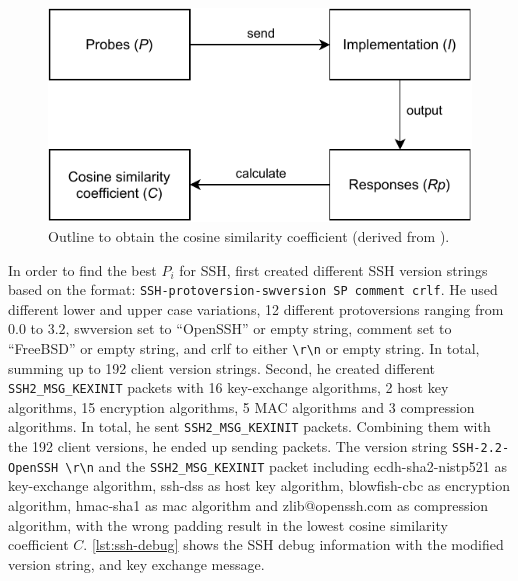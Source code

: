 \begin{figure}[ht]
    \centering
    \includegraphics{figures/vetterl_concept.pdf}
    \caption[Outline to obtain the cosine similarity coefficient]{Outline to obtain the cosine similarity coefficient (derived from \cite{vetterl2020}).}
    \label{fig:draft-cosine-similarity}
\end{figure}

In order to find the best $P_i$ for SSH, \citet{vetterl2020} first created different SSH version strings based on the format: \verb|SSH-protoversion-swversion SP comment crlf|.
He used different lower and upper case variations, 12 different protoversions ranging from $0.0$ to $3.2$, swversion set to \enquote{OpenSSH} or empty string, comment set to \enquote{FreeBSD} or empty string, and crlf to either \verb|\r\n| or empty string.
In total, summing up to 192 client version strings.
Second, he created different \verb|SSH2_MSG_KEXINIT| packets with 16 key-exchange algorithms, 2 host key algorithms, 15 encryption algorithms, 5 MAC algorithms and 3 compression algorithms.
In total, he sent  \verb|SSH2_MSG_KEXINIT| packets.
Combining them with the 192 client versions, he ended up sending  packets.
The version string \verb|SSH-2.2-OpenSSH \r\n| and the \verb|SSH2_MSG_KEXINIT| packet including ecdh-sha2-nistp521 as key-exchange algorithm, ssh-dss as host key algorithm, blowfish-cbc as encryption algorithm, hmac-sha1 as mac algorithm and zlib@openssh.com as compression algorithm, with the wrong padding result in the lowest cosine similarity coefficient $C$.
\autoref{lst:ssh-debug} shows the SSH debug information with the modified version string, and key exchange message.

\begin{figure}
    
\end{figure}

